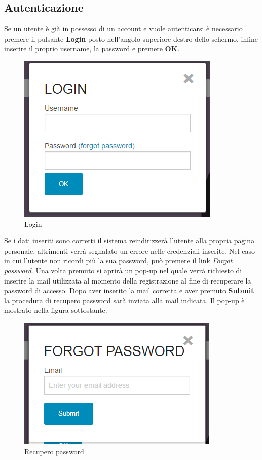\subsection{Autenticazione}
Se un utente è già in possesso di un account e vuole autenticarsi è necessario premere il pulsante \textbf{Login} posto nell'angolo superiore destro dello schermo, infine inserire il proprio username, la password e premere \textbf{OK}.

\begin{figure}[h] 
	\centering 
	\includegraphics[scale=0.40] {img/login.png}
	\caption{Login} 
\end{figure}

\noindent Se i dati inseriti sono corretti il sistema reindirizzerà l'utente alla propria pagina personale, altrimenti verrà segnalato un errore nelle credenziali inserite.
\newline
\noindent Nel caso in cui l'utente non ricordi più la sua password, può premere il link \textit{Forgot password}. Una volta premuto si aprirà un pop-up nel quale verrà richiesto di inserire la mail utilizzata al momento della registrazione al fine di recuperare la password di accesso. Dopo aver inserito la mail corretta e aver premuto \textbf{Submit} la procedura di recupero password sarà inviata alla mail indicata. Il pop-up è mostrato nella figura sottostante.

\begin{figure}[H] 
	\centering 
	\includegraphics[scale=0.40] {img/forgot.png}
	\caption{Recupero password} 
\end{figure}

